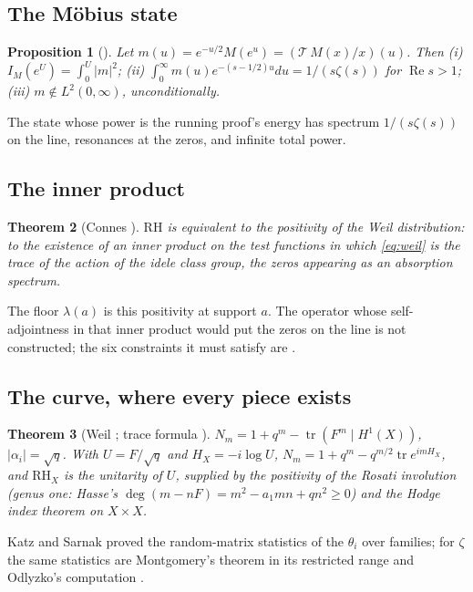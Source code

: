 \documentclass[11pt]{article}
\newtheorem{theorem}{Theorem}[section]
\newtheorem{proposition}[theorem]{Proposition}
\theoremstyle{definition}
\theoremstyle{remark}
\newcommand{\Ree}{\operatorname{Re}}
\newcommand{\tr}{\operatorname{tr}}
\begin{document}
\subsection{The Möbius state}
\begin{proposition}[{\cite[Prop.\ 3.2]{horizon}}]\label{prop:mstate}
Let $m(u)=e^{-u/2}M(e^u)=(\mathcal T\,M(x)/x)(u)$. Then (i) $I_M(e^U)=\int_0^U|m|^2$; (ii) $\int_0^\infty m(u)e^{-(s-1/2)u}du=1/(s\zeta(s))$ for $\Ree s>1$; (iii) $m\notin L^2(0,\infty)$, unconditionally.
\end{proposition}
The state whose power is the running proof's energy has spectrum $1/(s\zeta(s))$ on the line, resonances at the zeros, and infinite total power.

\subsection{The inner product}
\begin{theorem}[Connes \cite{connes99}]\label{thm:connes}
$\mathrm{RH}$ is equivalent to the positivity of the Weil distribution: to the existence of an inner product on the test functions in which \eqref{eq:weil} is the trace of the action of the idele class group, the zeros appearing as an absorption spectrum.
\end{theorem}
The floor $\lambda(a)$ is this positivity at support $a$. The operator whose self-adjointness in that inner product would put the zeros on the line is not constructed; the six constraints it must satisfy are \cite[\S4]{horizon}.

\subsection{The curve, where every piece exists}
\begin{theorem}[Weil \cite{weil48}; trace formula {\cite[Ch.\ VI]{milneEC}}]\label{thm:curve}
$N_m=1+q^m-\tr(F^m\mid H^1(X))$, $|\alpha_i|=\sqrt q$. With $U=F/\sqrt q$ and $H_X=-i\log U$, $N_m=1+q^m-q^{m/2}\tr e^{imH_X}$, and $\mathrm{RH}_X$ is the unitarity of $U$, supplied by the positivity of the Rosati involution (genus one: Hasse's $\deg(m-nF)=m^2-a_1mn+qn^2\ge0$) and the Hodge index theorem on $X\times X$.
\end{theorem}
Katz and Sarnak \cite{katzsarnak} proved the random-matrix statistics of the $\theta_i$ over families; for $\zeta$ the same statistics are Montgomery's theorem in its restricted range and Odlyzko's computation \cite{montgomery,odlyzko}.
\end{document}
